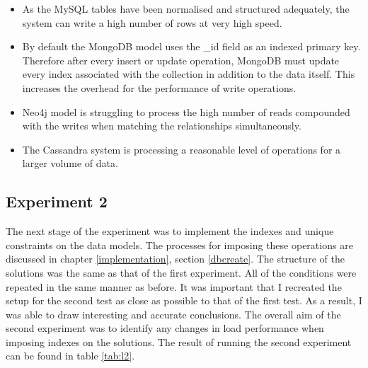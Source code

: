 \begin{itemize}
\item As the MySQL tables have been normalised and structured adequately, the system can write a high number of rows at very high speed.
\item By default the MongoDB model uses the \_id field as an indexed primary key. Therefore after every insert or update operation, MongoDB must update every index associated with the collection in addition to the data itself. This increases the overhead for the performance of write operations.
\item Neo4j model is struggling to process the high number of reads compounded with the writes when matching the relationships simultaneously.
\item The Cassandra system is processing a reasonable level of operations for a larger volume of data.
\end{itemize}

\subsection{Experiment 2}\label{experiment2}
The next stage of the experiment was to implement the indexes and unique constraints on the data models. The processes for imposing these operations are discussed in chapter \ref{implementation}, section \ref{dbcreate}. The structure of the solutions was the same as that of the first experiment. All of the conditions were repeated in the same manner as before. It was important that I recreated the setup for the second test as close as possible to that of the first test. As a result, I was able to draw interesting and accurate conclusions. The overall aim of the second experiment was to identify any changes in load performance when imposing indexes on the solutions. The result of running the second experiment can be found in table \ref{tab:l2}.

